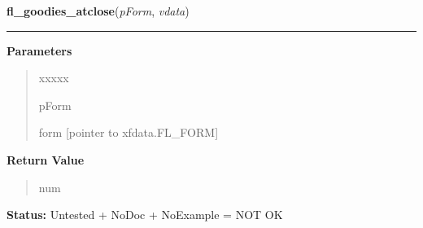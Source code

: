 \hspace{.8\funcindent}\begin{boxedminipage}{\funcwidth}

    \raggedright \textbf{fl\_goodies\_atclose}(\textit{pForm}, \textit{vdata})

    \vspace{-1.5ex}

    \rule{\textwidth}{0.5\fboxrule}
\setlength{\parskip}{2ex}
\setlength{\parskip}{1ex}
      \textbf{Parameters}
      \vspace{-1ex}

      \begin{quote}
        \begin{Ventry}{xxxxx}

          \item[pForm]

          form [pointer to xfdata.FL\_FORM]

        \end{Ventry}

      \end{quote}

      \textbf{Return Value}
    \vspace{-1ex}

      \begin{quote}
      num

      \end{quote}

\textbf{Status:} Untested + NoDoc + NoExample = NOT OK



    \end{boxedminipage}

    \label{xformslib:library:fl_add_input}

    \vspace{0.5ex}

